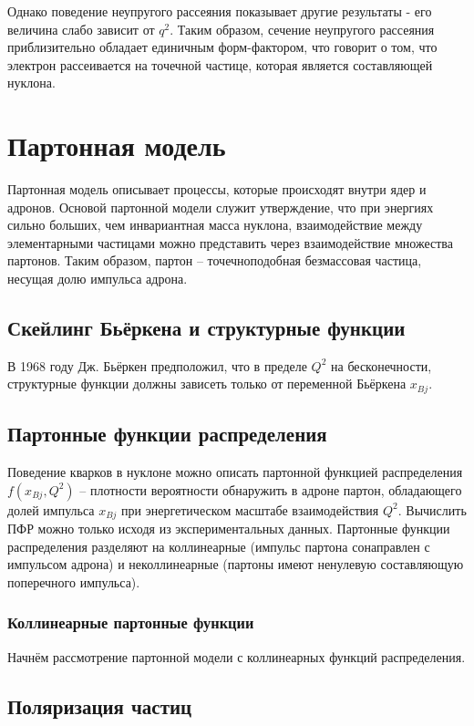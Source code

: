 \documentclass{extarticle}
\begin{document}
Однако поведение неупругого рассеяния показывает другие результаты - его величина слабо зависит от $q^2$. Таким образом, сечение неупругого рассеяния приблизительно обладает единичным форм-фактором, что говорит о том, что электрон рассеивается на точечной частице, которая является составляющей нуклона.



\newpage
\section{Партонная модель}
Партонная модель описывает процессы, которые происходят внутри ядер и адронов. Основой партонной модели служит утверждение, что при энергиях сильно больших, чем инвариантная масса нуклона, взаимодействие между элементарными частицами можно представить через взаимодействие множества партонов. Таким образом, партон -- точечноподобная безмассовая частица, несущая долю импульса адрона. 
\subsection{Скейлинг Бьёркена и структурные функции}

В 1968 году Дж. Бьёркен предположил, что в пределе $Q^2$ на бесконечности, структурные функции должны зависеть только от переменной Бьёркена $x_{Bj}$.  

\subsection{Партонные функции распределения}
Поведение кварков в нуклоне можно описать партонной функцией распределения $f(x_{Bj},Q^2)$ – плотности вероятности обнаружить в адроне партон, обладающего долей импульса $x_{Bj}$ при энергетическом масштабе взаимодействия $Q^2$. Вычислить ПФР можно только исходя из экспериментальных данных. Партонные функции распределения разделяют на коллинеарные (импульс партона сонаправлен с импульсом адрона) и неколлинеарные (партоны имеют ненулевую составляющую поперечного импульса).
\subsubsection{Коллинеарные партонные функции}
Начнём рассмотрение партонной модели с коллинеарных функций распределения. 
\newpage
\subsection{Поляризация частиц}
\end{document}
